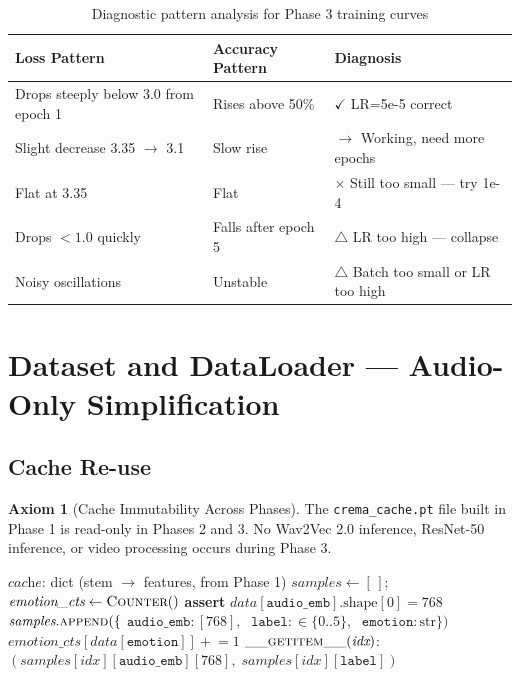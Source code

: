 \documentclass[12pt,a4paper]{article}
\theoremstyle{definition}
\newtheorem{axiom}[theorem]{Axiom}
\theoremstyle{remark}
\begin{document}
\begin{table}[H]
\centering
\caption{Diagnostic pattern analysis for Phase 3 training curves}
\begin{tabularx}{\textwidth}{XXl}
\toprule
Loss Pattern & Accuracy Pattern & Diagnosis \\
\midrule
Drops steeply below 3.0 from epoch 1 & Rises above 50\% & \textcolor{green!60!black}{$\checkmark$ LR=5e-5 correct} \\
Slight decrease 3.35 $\to$ 3.1 & Slow rise & \textcolor{blue!70!black}{$\rightarrow$ Working, need more epochs} \\
Flat at 3.35 & Flat & \textcolor{red!70!black}{$\times$ Still too small — try 1e-4} \\
Drops $< 1.0$ quickly & Falls after epoch 5 & \textcolor{orange!70!black}{$\triangle$ LR too high — collapse} \\
Noisy oscillations & Unstable & \textcolor{orange!70!black}{$\triangle$ Batch too small or LR too high} \\
\bottomrule
\end{tabularx}
\end{table}

\section{Dataset and DataLoader — Audio-Only Simplification}

\subsection{Cache Re-use}

\begin{axiom}[Cache Immutability Across Phases]
The \texttt{crema\_cache.pt} file built in Phase 1 is read-only in
Phases 2 and 3. No Wav2Vec 2.0 inference, ResNet-50 inference, or
video processing occurs during Phase 3.
\end{axiom}

\begin{algorithm}[H]
\caption{Phase 3 CREMADDataset — Audio-Only}
\label{alg:dataset}
\begin{algorithmic}[1]
\Require $\textit{cache}$: dict (stem $\to$ features, from Phase 1)
\State $\textit{samples} \gets [\,]$; $\textit{emotion\_cts} \gets \textsc{Counter}()$
  \State \textbf{assert} $\textit{data}[\texttt{audio\_emb}].\text{shape}[0] = 768$
  \State $\textit{samples}.\textsc{append}(\{$
         $\texttt{audio\_emb}: [768],\;$
         $\texttt{label}: \in\{0..5\},\;$
         $\texttt{emotion}: \text{str}\})$
  \State $\textit{emotion\_cts}[\textit{data}[\texttt{emotion}]] \mathrel{+}= 1$
\EndFor
\State $\textsc{\_\_getitem\_\_}(\textit{idx})$: \Return
    $(\textit{samples}[\textit{idx}][\texttt{audio\_emb}][768],\;
      \textit{samples}[\textit{idx}][\texttt{label}])$
\end{algorithmic}
\end{algorithm}
\end{document}
